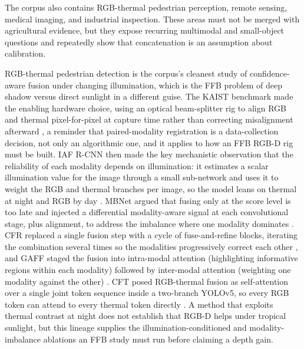 The corpus also contains RGB-thermal pedestrian perception, remote sensing, medical imaging, and industrial inspection. These areas must not be merged with agricultural evidence, but they expose recurring multimodal and small-object questions and repeatedly show that concatenation is an assumption about calibration.

RGB-thermal pedestrian detection is the corpus's cleanest study of confidence-aware fusion under changing illumination, which is the FFB problem of deep shadow versus direct sunlight in a different guise. The KAIST benchmark made the enabling hardware choice, using an optical beam-splitter rig to align RGB and thermal pixel-for-pixel at capture time rather than correcting misalignment afterward \cite{hwang2015kaist}, a reminder that paired-modality registration is a data-collection decision, not only an algorithmic one, and it applies to how an FFB RGB-D rig must be built. IAF R-CNN then made the key mechanistic observation that the reliability of each modality depends on illumination: it estimates a scalar illumination value for the image through a small sub-network and uses it to weight the RGB and thermal branches per image, so the model leans on thermal at night and RGB by day \cite{li2019illumination}. MBNet argued that fusing only at the score level is too late and injected a differential modality-aware signal at each convolutional stage, plus alignment, to address the imbalance where one modality dominates \cite{zhou2020mbnet}. CFR replaced a single fusion step with a cycle of fuse-and-refine blocks, iterating the combination several times so the modalities progressively correct each other \cite{zhang2020cfr}, and GAFF staged the fusion into intra-modal attention (highlighting informative regions within each modality) followed by inter-modal attention (weighting one modality against the other) \cite{zhang2021gaff}. CFT posed RGB-thermal fusion as self-attention over a single joint token sequence inside a two-branch YOLOv5, so every RGB token can attend to every thermal token directly \cite{fang2022cft}. A method that exploits thermal contrast at night does not establish that RGB-D helps under tropical sunlight, but this lineage supplies the illumination-conditioned and modality-imbalance ablations an FFB study must run before claiming a depth gain.


